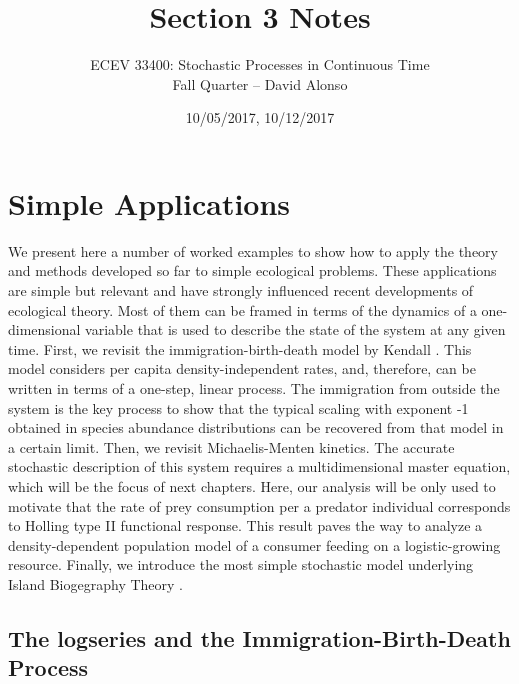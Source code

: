 \documentclass{article}
\begin{document}

\title{Section 3 Notes} %
\author{ECEV 33400: Stochastic Processes in Continuous Time  \\ Fall Quarter -- David Alonso} %
\date{10/05/2017, 10/12/2017} %

\maketitle

\setcounter{section}{1}

\section{Simple Applications}
We present here a number of worked examples to show how to apply the theory and methods developed so far to simple ecological problems. These applications are simple but relevant and have strongly influenced recent developments of ecological theory. Most of them can be framed in terms of the dynamics of a one-dimensional variable that is used to describe the state of the system at any given time. First, we revisit the immigration-birth-death model by Kendall \cite{Kendall48}. This model considers per capita density-independent rates, and, therefore, can be written in terms of a one-step, linear process. The immigration from outside the system is the key process to show that the typical scaling with exponent -1 obtained in species abundance distributions can be recovered from that model in a certain limit. Then, we revisit Michaelis-Menten kinetics. The accurate stochastic description of this system requires a multidimensional master equation, which will be the focus of next chapters. Here, our analysis will be only used to motivate that the rate of prey consumption per a predator individual corresponds to Holling type II functional response. This result paves the way to analyze a density-dependent population model of a consumer feeding on a logistic-growing resource. Finally, we introduce the most simple stochastic model underlying Island Biogegraphy Theory \cite{MacArthur67}.  

\subsection{The logseries and the Immigration-Birth-Death Process}
\end{document}
